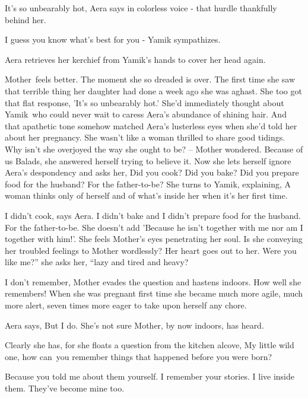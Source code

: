 \documentclass[12pt]{book}
\begin{document}
{\textquotedbl}It's so unbearably hot,{\textquotedbl} Aera says in colorless voice - that hurdle thankfully behind her.

{\textquotedbl}I guess you know what's best for you -{\textquotedbl} Yamik sympathizes.

Aera retrieves her kerchief from Yamik's hands to cover her head again.

Mother~feels better. The moment she so dreaded is over. The first time she saw that terrible thing her daughter had done
a week ago she was aghast. She too got that flat response, 'It's so unbearably hot.' She'd immediately thought about
Yamik~who could never wait to caress Aera's abundance of shining hair. And that apathetic tone somehow matched Aera's
lusterless eyes when she'd told her about her pregnancy. She wasn't like a woman thrilled to share good tidings. Why
isn't she overjoyed the way she ought to be? -- Mother wondered. Because of us Balads, she answered herself trying to
believe it. Now she lets herself ignore Aera's despondency and asks her, {\textquotedbl}Did you cook? Did you bake? Did
you prepare food for the husband? For the father-to-be?{\textquotedbl} She turns to Yamik, explaining, {\textquotedbl}A
woman thinks only of herself and of what's inside her when it's her first time.{\textquotedbl}

{\textquotedbl}I didn't cook,{\textquotedbl} says Aera. {\textquotedbl}I didn't bake and I didn't prepare food for the
husband. For the father-to-be.{\textquotedbl} She doesn't add 'Because he isn't together with me nor am I together with
him!'. She feels Mother's eyes penetrating her soul. Is she conveying her troubled feelings to Mother wordlessly? Her
heart goes out to her. {\textquotedbl}Were you like me?'' she asks her, ``lazy and tired and heavy?{\textquotedbl}

{\textquotedbl}I don't remember,{\textquotedbl} Mother evades the question and hastens indoors. How well she remembers!
When she was pregnant first time she became much more agile, much more alert, seven times more eager to take upon
herself any chore.~~~

Aera says, {\textquotedbl}But I do.{\textquotedbl} She's not sure Mother, by now indoors, has heard.

Clearly she has, for she floats a question from the kitchen alcove, {\textquotedbl}My little wild one, how can~you
remember things that happened before you were born?{\textquotedbl}

{\textquotedbl}Because you told me about them yourself. I remember your stories. I live inside them. They've become mine
too.{\textquotedbl}
\end{document}
